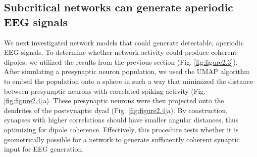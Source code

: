 \subsection{Subcritical networks can generate aperiodic EEG signals}
We next investigated network models that could generate detectable, aperiodic EEG signals. To determine whether network activity could produce coherent dipoles, we utilized the results from the previous section (Fig. \ref{fig:figure2.3}). After simulating a presynaptic neuron population, we used the UMAP algorithm\cite{McInnes2018} to embed the population onto a sphere in such a way that minimized the distance between presynaptic neurons with correlated spiking activity (Fig. \ref{fig:figure2.4}a). These presynaptic neurons were then projected onto the dendrites of the postsynaptic dyad (Fig. \ref{fig:figure2.4}a). By construction, synapses with higher correlations should have smaller angular distances, thus optimizing for dipole coherence. Effectively, this procedure tests whether it is geometrically possible for a network to generate sufficiently coherent synaptic input for EEG generation. 


